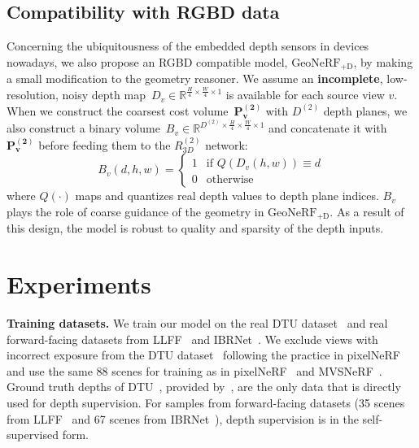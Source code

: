 \subsection{Compatibility with RGBD data} \label{sec:c3_rgbd_method}
Concerning the ubiquitousness of the embedded depth sensors in devices nowadays, we also propose an RGBD compatible model, $\text{GeoNeRF}_{\text{+D}}$, by making a small modification to the geometry reasoner. We assume an \textbf{incomplete}, low-resolution, noisy depth map~$D_{v} \in \mathbb{R}^{\frac{H}{4} \times \frac{W}{4} \times 1}$ is available for each source view $v$. When we construct the coarsest cost volume~$\boldsymbol{P^{(2)}_{v}}$ with $D^{(2)}$ depth planes, we also construct a binary volume~$B_{v} \in \mathbb{R}^{D^{(2)} \times \frac{H}{4} \times \frac{W}{4} \times 1}$ and concatenate it with $\boldsymbol{P^{(2)}_{v}}$ before feeding them to the $R^{(2)}_{3D}$ network:
\begin{equation}
    B_{v}(d,h,w) = \begin{cases} 
    1 &\mbox{if } Q \left( D_{v} \left(h,w \right) \right) \equiv d \\
    0 & \mbox{otherwise} 
    \end{cases}
\end{equation}
where $Q(\cdot)$ maps and quantizes real depth values to depth plane indices. $B_{v}$ plays the role of coarse guidance of the geometry in $\text{GeoNeRF}_{\text{+D}}$. As a result of this design, the model is robust to quality and sparsity of the depth inputs.

\section{Experiments} \label{sec:c3_experiments}
\noindent\textbf{Training datasets.} We train our model on the real DTU dataset~\citep{jensen2014large} and real forward-facing datasets from LLFF~\citep{mildenhall2019llff} and IBRNet~\citep{wang2021ibrnet}. We exclude views with incorrect exposure from the DTU dataset~\citep{jensen2014large} following the practice in pixelNeRF~\citep{yu2021pixelnerf} and use the same 88 scenes for training as in pixelNeRF~\citep{yu2021pixelnerf} and MVSNeRF~\citep{chen2021mvsnerf}. Ground truth depths of DTU~\citep{jensen2014large}, provided by~\cite{yao2018mvsnet}, are the only data that is directly used for depth supervision. For samples from forward-facing datasets (35 scenes from LLFF~\citep{mildenhall2019llff} and 67 scenes from IBRNet~\citep{wang2021ibrnet}), depth supervision is in the self-supervised form. \\


